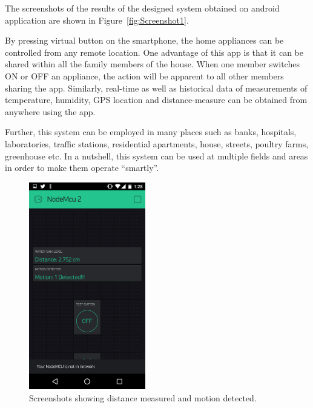 \documentclass[journal,twoside]{IEEEtran}
\begin{document}
The screenshots of the results of the designed system
obtained on android application are shown in Figure~\ref{fig:Screenshot1}.



By pressing virtual button on the smartphone, the home
appliances can be controlled from any remote location. One
advantage of this app is that it can be shared within all the family
members of the house. When one member switches ON or OFF
an appliance, the action will be apparent to all other members
sharing the app. Similarly, real-time as well as historical data of
measurements of temperature, humidity, GPS location and
distance-measure can be obtained from anywhere using the app.

Further, this system can be employed in many places such as
banks, hospitals, laboratories, traffic stations, residential
apartments, house, streets, poultry farms, greenhouse etc. In a
nutshell, this system can be used at multiple fields and areas in
order to make them operate “smartly”.

\begin{figure}[H]
\centering
\includegraphics[width=2.0in]{figure5}
\caption{Screenshots showing distance measured and motion detected.}
\label{fig:Screenshot2}
\end{figure}
\end{document}
